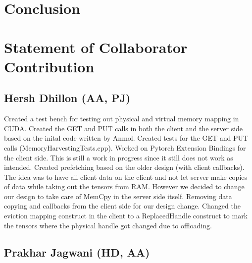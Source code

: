 \documentclass{article}
\begin{document}
\section{Conclusion}

\section{Statement of Collaborator Contribution}
\subsection{Hersh Dhillon (AA, PJ)}

Created a test bench for testing out physical and virtual memory mapping in CUDA.
Created the GET and PUT calls in both the client and the server side based on the inital code written by Anmol.
Created tests for the GET and PUT calls (MemoryHarvestingTests.cpp).
Worked on Pytorch Extension Bindings for the client side. This is still a work in progress since it still does not work as intended.
Created prefetching based on the older design (with client callbacks). The idea was to have all client data on the client and not let server make copies of data while taking out the tensors from RAM. However we decided to change our design to take care of MemCpy in the server side itself.
Removing data copying and callbacks from the client side for our design change. Changed the eviction mapping construct in the client to a ReplacedHandle construct to mark the tensors where the physical handle got changed due to offloading.

\subsection{Prakhar Jagwani (HD, AA)}
\end{document}
